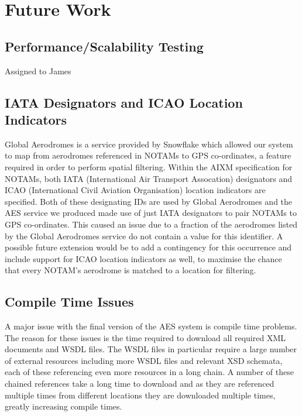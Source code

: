 \documentclass[a4paper, 12pt, twoside]{article}
\begin{document}
\section{Future Work}
\label{sec:future_work}

\subsection{Performance/Scalability Testing}
\label{sec:future_testing}
Assigned to James

\subsection{IATA Designators and ICAO Location Indicators}
\label{sec:future_designators}

Global Aerodromes is a service provided by Snowflake which allowed our system to map from aerodromes referenced in NOTAMs to GPS co-ordinates, a feature required in order to perform spatial filtering. Within the AIXM specification for NOTAMs, both IATA (International Air Transport Assocation) designators and ICAO (International Civil Aviation Organisation) location indicators are specified. Both of these designating IDs are used by Global Aerodromes and the AES service we produced made use of just IATA designators to pair NOTAMs to GPS co-ordinates. This caused an issue due to a fraction of the aerodromes listed by the Global Aerodromes service do not contain a value for this identifier. A possible future extension would be to add a contingency for this occurrence and include support for ICAO location indicators as well, to maximise the chance that every NOTAM's aerodrome is matched to a location for filtering.

\subsection{Compile Time Issues}
\label{sec:future_compilation}

A major issue with the final version of the AES system is compile time problems. The reason for these issues is the time required to download all required XML documents and WSDL files. The WSDL files in particular require a large number of external resources including more WSDL files and relevant XSD schemata, each of these referencing even more resources in a long chain. A number of these chained references take a long time to download and as they are referenced multiple times from different locations they are downloaded multiple times, greatly increasing compile times.
\end{document}
